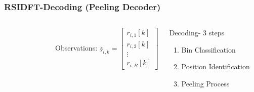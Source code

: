\documentclass[10pt,xcolor=table]{beamer}
\newcommand{\zv}{\underline{z}}
\newcommand{\rv}{\underline{r}}
\begin{document}
\begin{frame}\frametitle{RSIDFT-Decoding (Peeling Decoder)}
\begin{columns}
		\begin{figure}[h!]
			\begin{center}
				\resizebox{1.0\textwidth}{!}{}	
			\end{center}	
		\end{figure}
	    \begin{block}{Observations:}
	          $
	    		\zv_{i,k} = \begin{bmatrix}
	    		r_{i,1}[k]\\
	    		r_{i,2}[k]\\
	    		\vdots\\
	    		r_{i,B}[k]
	    		\end{bmatrix}
	    		$
	    	\end{block}
	    	\begin{block}{Decoding- 3 steps}	
	    		\begin{enumerate}
	    			\item Bin Classification
	    			\item Position Identification
	    			\item Peeling Process
	    		\end{enumerate}
	
	    \end{block}
	
		
\end{columns}	
\end{frame}
\end{document}
